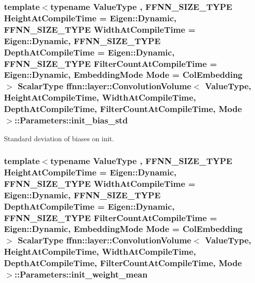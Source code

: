 \hypertarget{structffnn_1_1layer_1_1_convolution_volume_1_1_parameters_abfb1c3a2a3d63fdea50bd57614ee0bed}{
\subsubsection[{init\-\_\-bias\-\_\-std}]{\setlength{\rightskip}{0pt plus 5cm}template$<$typename Value\-Type , F\-F\-N\-N\-\_\-\-S\-I\-Z\-E\-\_\-\-T\-Y\-P\-E Height\-At\-Compile\-Time = Eigen\-::\-Dynamic, F\-F\-N\-N\-\_\-\-S\-I\-Z\-E\-\_\-\-T\-Y\-P\-E Width\-At\-Compile\-Time = Eigen\-::\-Dynamic, F\-F\-N\-N\-\_\-\-S\-I\-Z\-E\-\_\-\-T\-Y\-P\-E Depth\-At\-Compile\-Time = Eigen\-::\-Dynamic, F\-F\-N\-N\-\_\-\-S\-I\-Z\-E\-\_\-\-T\-Y\-P\-E Filter\-Count\-At\-Compile\-Time = Eigen\-::\-Dynamic, Embedding\-Mode Mode = Col\-Embedding$>$ {\bf Scalar\-Type} {\bf ffnn\-::layer\-::\-Convolution\-Volume}$<$ Value\-Type, Height\-At\-Compile\-Time, Width\-At\-Compile\-Time, Depth\-At\-Compile\-Time, Filter\-Count\-At\-Compile\-Time, Mode $>$\-::Parameters\-::init\-\_\-bias\-\_\-std}}\label{structffnn_1_1layer_1_1_convolution_volume_1_1_parameters_abfb1c3a2a3d63fdea50bd57614ee0bed}


Standard deviation of biases on init. 

\hypertarget{structffnn_1_1layer_1_1_convolution_volume_1_1_parameters_ad1404701e7f09ee0bbe6fe0a2bd793bc}{
\subsubsection[{init\-\_\-weight\-\_\-mean}]{\setlength{\rightskip}{0pt plus 5cm}template$<$typename Value\-Type , F\-F\-N\-N\-\_\-\-S\-I\-Z\-E\-\_\-\-T\-Y\-P\-E Height\-At\-Compile\-Time = Eigen\-::\-Dynamic, F\-F\-N\-N\-\_\-\-S\-I\-Z\-E\-\_\-\-T\-Y\-P\-E Width\-At\-Compile\-Time = Eigen\-::\-Dynamic, F\-F\-N\-N\-\_\-\-S\-I\-Z\-E\-\_\-\-T\-Y\-P\-E Depth\-At\-Compile\-Time = Eigen\-::\-Dynamic, F\-F\-N\-N\-\_\-\-S\-I\-Z\-E\-\_\-\-T\-Y\-P\-E Filter\-Count\-At\-Compile\-Time = Eigen\-::\-Dynamic, Embedding\-Mode Mode = Col\-Embedding$>$ {\bf Scalar\-Type} {\bf ffnn\-::layer\-::\-Convolution\-Volume}$<$ Value\-Type, Height\-At\-Compile\-Time, Width\-At\-Compile\-Time, Depth\-At\-Compile\-Time, Filter\-Count\-At\-Compile\-Time, Mode $>$\-::Parameters\-::init\-\_\-weight\-\_\-mean}}\label{structffnn_1_1layer_1_1_convolution_volume_1_1_parameters_ad1404701e7f09ee0bbe6fe0a2bd793bc}



